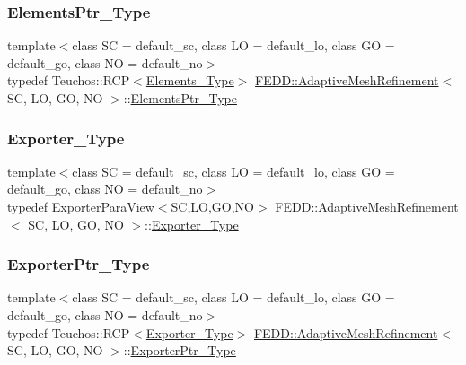 \subsubsection{\texorpdfstring{Elements\+Ptr\+\_\+\+Type}{ElementsPtr\_Type}}
{\footnotesize\ttfamily template$<$class SC  = default\+\_\+sc, class LO  = default\+\_\+lo, class GO  = default\+\_\+go, class NO  = default\+\_\+no$>$ \\
typedef Teuchos\+::\+R\+CP$<$\hyperlink{classFEDD_1_1AdaptiveMeshRefinement_ae08f7ca72876c1aba944120b3ca088d3}{Elements\+\_\+\+Type}$>$ \hyperlink{classFEDD_1_1AdaptiveMeshRefinement}{F\+E\+D\+D\+::\+Adaptive\+Mesh\+Refinement}$<$ SC, LO, GO, NO $>$\+::\hyperlink{classFEDD_1_1AdaptiveMeshRefinement_a9a08c5e3801ff9f9f3dff7997f9f4b1b}{Elements\+Ptr\+\_\+\+Type}}

\mbox{\label{classFEDD_1_1AdaptiveMeshRefinement_a67eda4a3b688720eec1f8d4a6dcb7577}} 
\subsubsection{\texorpdfstring{Exporter\+\_\+\+Type}{Exporter\_Type}}
{\footnotesize\ttfamily template$<$class SC  = default\+\_\+sc, class LO  = default\+\_\+lo, class GO  = default\+\_\+go, class NO  = default\+\_\+no$>$ \\
typedef Exporter\+Para\+View$<$SC,LO,GO,NO$>$ \hyperlink{classFEDD_1_1AdaptiveMeshRefinement}{F\+E\+D\+D\+::\+Adaptive\+Mesh\+Refinement}$<$ SC, LO, GO, NO $>$\+::\hyperlink{classFEDD_1_1AdaptiveMeshRefinement_a67eda4a3b688720eec1f8d4a6dcb7577}{Exporter\+\_\+\+Type}}

\mbox{\label{classFEDD_1_1AdaptiveMeshRefinement_ac8cda8533e68f9049ede0208be2175d6}} 
\subsubsection{\texorpdfstring{Exporter\+Ptr\+\_\+\+Type}{ExporterPtr\_Type}}
{\footnotesize\ttfamily template$<$class SC  = default\+\_\+sc, class LO  = default\+\_\+lo, class GO  = default\+\_\+go, class NO  = default\+\_\+no$>$ \\
typedef Teuchos\+::\+R\+CP$<$\hyperlink{classFEDD_1_1AdaptiveMeshRefinement_a67eda4a3b688720eec1f8d4a6dcb7577}{Exporter\+\_\+\+Type}$>$ \hyperlink{classFEDD_1_1AdaptiveMeshRefinement}{F\+E\+D\+D\+::\+Adaptive\+Mesh\+Refinement}$<$ SC, LO, GO, NO $>$\+::\hyperlink{classFEDD_1_1AdaptiveMeshRefinement_ac8cda8533e68f9049ede0208be2175d6}{Exporter\+Ptr\+\_\+\+Type}}

